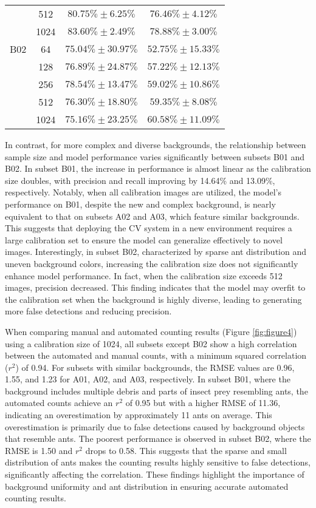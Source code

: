 \begin{table}[H]
\begin{tabular}{cccc}
        & 512 & $80.75\% \pm 6.25\%$ & $76.46\% \pm 4.12\%$ \\
        & 1024 & $\mathbf{83.60\% \pm 2.49\%}$ & $\mathbf{78.88\% \pm 3.00\%}$ \\
        \midrule
        B02 & 64 & $75.04\% \pm 30.97\%$ & $52.75\% \pm 15.33\%$ \\
        & 128 & $76.89\% \pm 24.87\%$ & $57.22\% \pm 12.13\%$ \\
        & 256 & $78.54\% \pm 13.47\%$ & $59.02\% \pm 10.86\%$ \\
        & 512 & $76.30\% \pm 18.80\%$ & $59.35\% \pm 8.08\%$ \\
        & 1024 & $\mathbf{75.16\% \pm 23.25\%}$ & $\mathbf{60.58\% \pm 11.09\%}$ \\
        \bottomrule
    \end{tabular}
\end{table}

In contrast, for more complex and diverse backgrounds, the relationship between sample size and model performance varies significantly between subsets B01 and B02. In subset B01, the increase in performance is almost linear as the calibration size doubles, with precision and recall improving by 14.64\% and 13.09\%, respectively. Notably, when all calibration images are utilized, the model’s performance on B01, despite the new and complex background, is nearly equivalent to that on subsets A02 and A03, which feature similar backgrounds. This suggests that deploying the CV system in a new environment requires a large calibration set to ensure the model can generalize effectively to novel images. Interestingly, in subset B02, characterized by sparse ant distribution and uneven background colors, increasing the calibration size does not significantly enhance model performance. In fact, when the calibration size exceeds 512 images, precision decreased. This finding indicates that the model may overfit to the calibration set when the background is highly diverse, leading to generating more false detections and reducing precision.

When comparing manual and automated counting results (Figure \ref{fig:figure4}) using a calibration size of 1024, all subsets except B02 show a high correlation between the automated and manual counts, with a minimum squared correlation ($r^2$) of 0.94. For subsets with similar backgrounds, the RMSE values are 0.96, 1.55, and 1.23 for A01, A02, and A03, respectively. In subset B01, where the background includes multiple debris and parts of insect prey resembling ants, the automated counts achieve an $r^2$ of 0.95 but with a higher RMSE of 11.36, indicating an overestimation by approximately 11 ants on average. This overestimation is primarily due to false detections caused by background objects that resemble ants. The poorest performance is observed in subset B02, where the RMSE is 1.50 and $r^2$ drops to 0.58. This suggests that the sparse and small distribution of ants makes the counting results highly sensitive to false detections, significantly affecting the correlation. These findings highlight the importance of background uniformity and ant distribution in ensuring accurate automated counting results.

